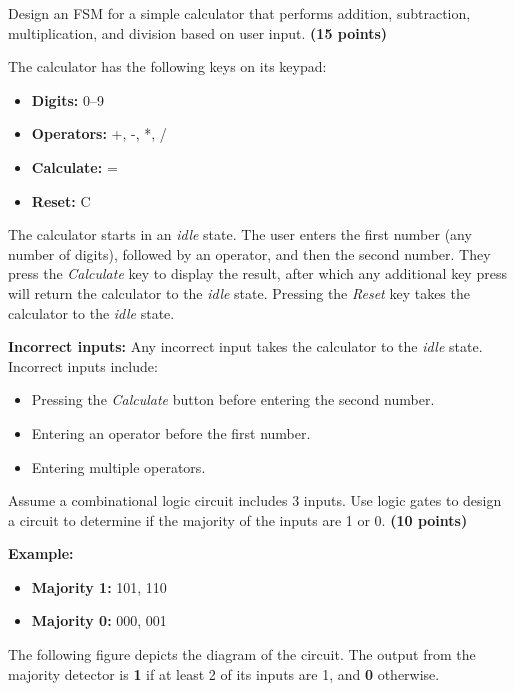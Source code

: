 \documentclass[10pt,answers]{exam}
\newcommand{\qpoints}[1]{\hfill \textbf{(#1 points)}}
\begin{document}
\begin{questions}

\question Design an FSM for a simple calculator that performs addition, subtraction, multiplication, and division based on user input. \qpoints{15}

The calculator has the following keys on its keypad:
\begin{itemize}
    \item \textbf{Digits:} 0--9
    \item \textbf{Operators:} +, -, *, /
    \item \textbf{Calculate:} =
    \item \textbf{Reset:} C
\end{itemize}

The calculator starts in an \textit{idle} state. The user enters the first number (any number of digits), followed by an operator, and then the second number. They press the \textit{Calculate} key to display the result, after which any additional key press will return the calculator to the \textit{idle} state. Pressing the \textit{Reset} key takes the calculator to the \textit{idle} state.

\textbf{Incorrect inputs:} Any incorrect input takes the calculator to the \textit{idle} state. Incorrect inputs include:
\begin{itemize}
    \item Pressing the \textit{Calculate} button before entering the second number.
    \item Entering an operator before the first number.
    \item Entering multiple operators.
\end{itemize}

\begin{solution}
    
\end{solution}

\question Assume a combinational logic circuit includes 3 inputs. Use logic gates to design a circuit to determine if the majority of the inputs are 1 or 0. \qpoints{10}

\textbf{Example:} 
\begin{itemize}
    \item \textbf{Majority 1:} 101, 110
    \item \textbf{Majority 0:} 000, 001
\end{itemize}

The following figure depicts the diagram of the circuit. The output from the majority detector is \textbf{1} if at least 2 of its inputs are 1, and \textbf{0} otherwise.


\end{questions}
\end{document}
